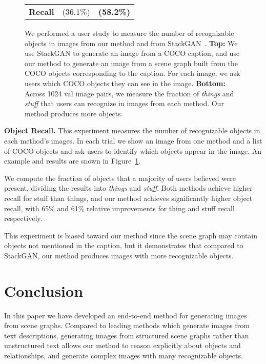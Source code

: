 \documentclass[10pt,twocolumn,letterpaper]{article}
\begin{document}
\begin{figure}
\begin{tabular}{c|cc}
    \textbf{Recall}  & (36.1\%)    & \textbf{(58.2\%)}
  \end{tabular}
  \vspace{1mm}
  \caption{
    We performed a user study to measure the number of recognizable objects in images from our
    method and from StackGAN~\cite{zhang2017stackgan}. \textbf{Top:} We use StackGAN to generate
    an image from a COCO caption, and use our method to generate an image from a scene graph built from
    the COCO objects corresponding to the caption. For each image, we ask users which COCO objects they
    can see in the image. \textbf{Bottom:} Across 1024 val image pairs, we measure the fraction of \emph{things}
    and \emph{stuff} that users can recognize in images from each method. Our method produces more objects.
  }
    \label{fig:object-study}
    \vspace{-3mm}
\end{figure}

 
\textbf{Object Recall.}
This experiment measures the number of recognizable objects in each method's images. In each trial we show an image from one method and a list of COCO objects and ask users to identify which objects appear in the image. An example and results are snown in Figure~\ref{fig:object-study}.

We compute the fraction of objects that a majority of users believed were
present, dividing the results into \emph{things} and \emph{stuff}. Both methods
achieve higher recall for stuff than things, and our method achieves
significantly higher object recall, with 65\% and 61\% relative improvements for thing and stuff recall respectively.

This experiment is biased toward our method since the scene graph may
contain objects not mentioned in the caption, but it demonstrates
that compared to StackGAN, our method produces images with
more recognizable objects.

 

\section{Conclusion}
In this paper we have developed an end-to-end method for generating images from
scene graphs. Compared to leading methods which generate images from text
descriptions, generating images from structured scene graphs rather than
unstructured text allows our method to reason explicitly about objects and
relationships, and generate complex images with many recognizable objects.
 
\end{document}
